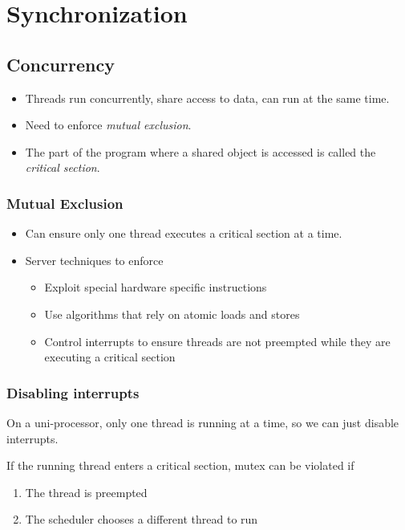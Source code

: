 \documentclass[12pt]{article}
\begin{document}
\section{Synchronization}

\subsection{Concurrency} 

\begin{itemize}
    \item Threads run concurrently, share access to data, can run at the same
        time.
    \item Need to enforce \textit{mutual exclusion}.
    \item The part of the program where a shared object is accessed is called
        the \textit{critical section}.
\end{itemize}

\subsubsection{Mutual Exclusion}

\begin{itemize}
    \item Can ensure only one thread executes a critical section at a time.
    \item Server techniques to enforce
        \begin{itemize}
            \item Exploit special hardware specific instructions
            \item Use algorithms that rely on atomic loads and stores
            \item Control interrupts to ensure threads are not preempted while
                they are executing a critical section
        \end{itemize}
\end{itemize}

\subsubsection{Disabling interrupts}

On a uni-processor, only one thread is running at a time, so we can just disable
interrupts.

If the running thread enters a critical section, mutex can be violated if
\begin{enumerate}
    \item The thread is preempted
    \item The scheduler chooses a different thread to run
\end{enumerate}
\end{document}
